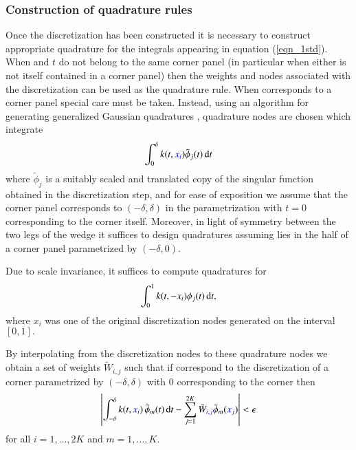 \subsubsection{Construction of quadrature rules}

Once the discretization has been constructed it is necessary to construct appropriate quadrature for the integrals appearing in equation (\ref{eqn_1std}). When  and $t$ do not belong to the same corner panel (in particular when either is not itself contained in a corner panel) then the weights and nodes associated with the discretization can be used as the quadrature rule. When  corresponds to a corner panel special care must be taken. Instead, using an algorithm for generating generalized Gaussian quadratures \cite{bremer2010}, quadrature nodes are chosen which integrate
\begin{align}
\int_{0}^\delta k(t,{\color{blue} x_i}) \tilde{\phi}_j(t)\,{\rm d}t
\end{align} 
where $\tilde{\phi}_j$ is a suitably scaled and translated copy of the singular function obtained in the discretization step, and for ease of exposition we assume that the corner panel corresponds to $(-\delta,\delta)$ in the parametrization with $t=0$ corresponding to the corner itself. Moreover, in light of symmetry between the two legs of the wedge it suffices to design quadratures assuming   lies in the half of a corner panel parametrized by $(-\delta,0).$
\begin{remark}
Due to scale invariance, it suffices to compute quadratures for 
\begin{align}
\int_{0}^1 k(t,-x_i) {\phi}_j(t)\,{\rm d}t,
\end{align} 
where $x_i$ was one of the original discretization nodes generated on the interval $[0,1].$
\end{remark}
\begin{remark}
By interpolating from the discretization nodes to these quadrature nodes we obtain a set of weights $\tilde{W}_{i,j}$ such that if  correspond to the discretization of a corner parametrized by $(-\delta,\delta)$ with $0$ corresponding to the corner then
\begin{align}
\left| \int_{-\delta}^\delta k(t,{\color{blue} x_i}) \, \tilde{\phi}_m(t)\,{\rm d}t - \sum_{j=1}^{2K} \tilde{W}_{{\color{blue} i,j}} \tilde{\phi}_{m}({\color{blue} x_j}) \right| < \epsilon
\end{align}
for all $i=1,\dots,2K$ and $m=1,\dots,K.$
\end{remark}

